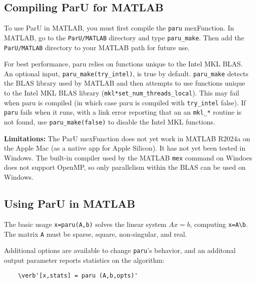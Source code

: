 \documentclass[12pt]{article}
\begin{document}
\subsection{Compiling ParU for MATLAB}

To use ParU in MATLAB, you must first compile the \verb'paru' mexFunction.
In MATLAB, go to the \verb'ParU/MATLAB' directory and type \verb'paru_make'.
Then add the \verb'ParU/MATLAB' directory to your MATLAB path for future use.

For best performance, paru relies on functions unique to the Intel MKL BLAS.
An optional input, \verb'paru_make(try_intel)', is true by default.
\verb'paru_make' detects the BLAS library used by MATLAB and then attempts to
use functions unique to the Intel MKL BLAS library
(\verb'mkl*set_num_threads_local').  This may fail when paru is compiled (in
which case paru is compiled with \verb'try_intel' false).  If \verb'paru' fails
when it runs, with a link error reporting that an an \verb'mkl_*' routine is
not found, use \verb'paru_make(false)' to disable the Intel MKL functions.

{\bf Limitations:}  The ParU mexFunction does not yet work in MATLAB R2024a
on the Apple Mac (as a native app for Apple Silicon).
It has not yet been tested in Windows.  %
The built-in compiler used by the MATLAB \verb'mex' command on Windoes does not
support OpenMP, so only parallelism within the BLAS can be used on Windows.

\subsection{Using ParU in MATLAB}

The basic usage \verb'x=paru(A,b)' solves the linear system $Ax=b$, computing
\verb'x=A\b'.  The matrix \verb'A' must be sparse, square, non-singular, and
real.

Additional options are available to change \verb'paru''s behavior, and
an additonal output parameter reports statistics on the algorithm:

    \begin{verbatim}
    \verb'[x,stats] = paru (A,b,opts)'
    \end{verbatim}
\end{document}
